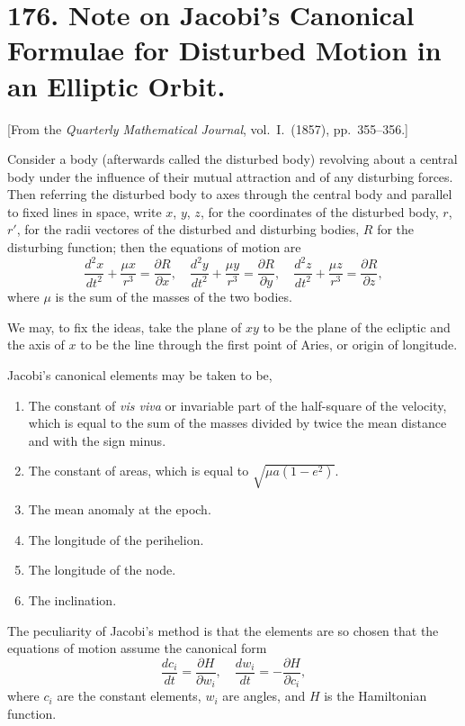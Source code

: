 \documentclass[11pt,a4paper]{book}
\begin{document}
\newpage
\section*{176. Note on Jacobi's Canonical Formulae for Disturbed Motion in an Elliptic Orbit.}

[From the \textit{Quarterly Mathematical Journal}, vol.~I.~(1857), pp.~355--356.]

Consider a body (afterwards called the disturbed body) revolving about a central body under the influence of their mutual attraction and of any disturbing forces. Then referring the disturbed body to axes through the central body and parallel to fixed lines in space, write $x$, $y$, $z$, for the coordinates of the disturbed body, $r$, $r'$, for the radii vectores of the disturbed and disturbing bodies, $R$ for the disturbing function; then the equations of motion are
\[
\frac{d^2x}{dt^2} + \frac{\mu x}{r^3} = \frac{\partial R}{\partial x},\quad
\frac{d^2y}{dt^2} + \frac{\mu y}{r^3} = \frac{\partial R}{\partial y},\quad
\frac{d^2z}{dt^2} + \frac{\mu z}{r^3} = \frac{\partial R}{\partial z},
\]
where $\mu$ is the sum of the masses of the two bodies.

We may, to fix the ideas, take the plane of $xy$ to be the plane of the ecliptic and the axis of $x$ to be the line through the first point of Aries, or origin of longitude.

Jacobi's canonical elements may be taken to be,
\begin{enumerate}[label=\arabic*.]
\item The constant of \textit{vis viva} or invariable part of the half-square of the velocity, which is equal to the sum of the masses divided by twice the mean distance and with the sign minus.
\item The constant of areas, which is equal to $\sqrt{\mu a(1-e^2)}$.
\item The mean anomaly at the epoch.
\item The longitude of the perihelion.
\item The longitude of the node.
\item The inclination.
\end{enumerate}

The peculiarity of Jacobi's method is that the elements are so chosen that the equations of motion assume the canonical form
\[
\frac{dc_i}{dt} = \frac{\partial H}{\partial w_i},\quad
\frac{dw_i}{dt} = -\frac{\partial H}{\partial c_i},
\]
where $c_i$ are the constant elements, $w_i$ are angles, and $H$ is the Hamiltonian function.
\end{document}
